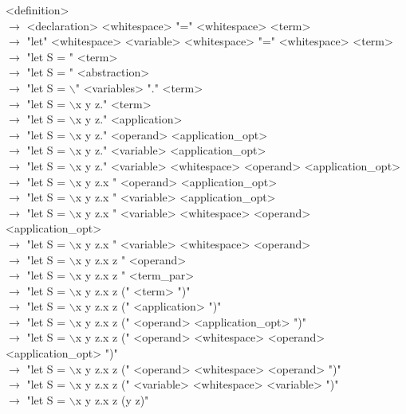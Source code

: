 \documentclass[12pt]{article}
\begin{document}
<definition> \\
$\rightarrow$ <declaration> <whitespace> "=" <whitespace> <term> \\
$\rightarrow$ "let" <whitespace> <variable> <whitespace> "=" <whitespace> <term> \\
$\rightarrow$ "let S = " <term> \\
$\rightarrow$ "let S = " <abstraction> \\
$\rightarrow$ "let S = $\backslash$" <variables> "." <term> \\
$\rightarrow$ "let S = $\backslash$x y z." <term> \\
$\rightarrow$ "let S = $\backslash$x y z." <application> \\
$\rightarrow$ "let S = $\backslash$x y z." <operand> <application\_opt> \\
$\rightarrow$ "let S = $\backslash$x y z." <variable> <application\_opt> \\
$\rightarrow$ "let S = $\backslash$x y z." <variable> <whitespace> <operand> <application\_opt> \\
$\rightarrow$ "let S = $\backslash$x y z.x " <operand> <application\_opt> \\
$\rightarrow$ "let S = $\backslash$x y z.x " <variable> <application\_opt> \\
$\rightarrow$ "let S = $\backslash$x y z.x " <variable> <whitespace> <operand> <application\_opt> \\
$\rightarrow$ "let S = $\backslash$x y z.x " <variable> <whitespace> <operand> \\
$\rightarrow$ "let S = $\backslash$x y z.x z " <operand> \\
$\rightarrow$ "let S = $\backslash$x y z.x z " <term\_par> \\
$\rightarrow$ "let S = $\backslash$x y z.x z (" <term> ")" \\
$\rightarrow$ "let S = $\backslash$x y z.x z (" <application> ")" \\
$\rightarrow$ "let S = $\backslash$x y z.x z (" <operand> <application\_opt> ")" \\
$\rightarrow$ "let S = $\backslash$x y z.x z (" <operand> <whitespace> <operand> <application\_opt> ")" \\
$\rightarrow$ "let S = $\backslash$x y z.x z (" <operand> <whitespace> <operand> ")" \\
$\rightarrow$ "let S = $\backslash$x y z.x z (" <variable> <whitespace> <variable> ")" \\
$\rightarrow$ "let S = $\backslash$x y z.x z (y z)" \\
\end{document}
